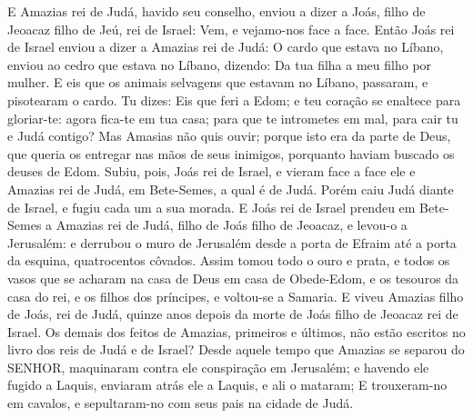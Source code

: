 {E Amazias rei de Judá, havido seu conselho, enviou a dizer a Joás, filho de Jeoacaz filho de Jeú, rei de Israel: Vem, e vejamo-nos face a face.
Então Joás rei de Israel enviou a dizer a Amazias rei de Judá: O cardo que estava no Líbano, enviou ao cedro que estava no Líbano, dizendo: Da tua filha a meu filho por mulher. E eis que os animais selvagens que estavam no Líbano, passaram, e pisotearam o cardo.
Tu dizes: Eis que feri a Edom; e teu coração se enaltece para gloriar-te: agora fica-te em tua casa; para que te intrometes em mal, para cair tu e Judá contigo?
Mas Amasias não quis ouvir; porque isto era da parte de Deus, que queria os entregar nas mãos de seus inimigos, porquanto haviam buscado os deuses de Edom.
Subiu, pois, Joás rei de Israel, e vieram face a face ele e Amazias rei de Judá, em Bete-Semes, a qual é de Judá.
Porém caiu Judá diante de Israel, e fugiu cada um a sua morada.
E Joás rei de Israel prendeu em Bete-Semes a Amazias rei de Judá, filho de Joás filho de Jeoacaz, e levou-o a Jerusalém: e derrubou o muro de Jerusalém desde a porta de Efraim até a porta da esquina, quatrocentos côvados.
Assim tomou todo o ouro e prata, e todos os vasos que se acharam na casa de Deus em casa de Obede-Edom, e os tesouros da casa do rei, e os filhos dos príncipes, e voltou-se a Samaria.
E viveu Amazias filho de Joás, rei de Judá, quinze anos depois da morte de Joás filho de Jeoacaz rei de Israel.
Os demais dos feitos de Amazias, primeiros e últimos, não estão escritos no livro dos reis de Judá e de Israel?
Desde aquele tempo que Amazias se separou do SENHOR, maquinaram contra ele conspiração em Jerusalém; e havendo ele fugido a Laquis, enviaram atrás ele a Laquis, e ali o mataram;
E trouxeram-no em cavalos, e sepultaram-no com seus pais na cidade de Judá.

}
